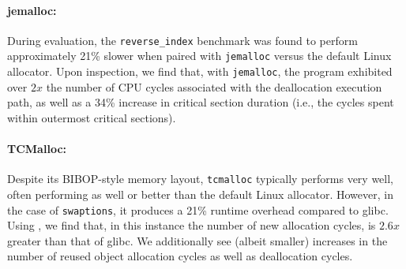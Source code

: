 \paragraph{jemalloc:}
During evaluation, the \texttt{reverse\_index} benchmark was found to perform approximately 21\% slower when paired with \texttt{jemalloc} versus the default Linux allocator. Upon inspection, we find that, with \texttt{jemalloc}, the program exhibited over $2x$ the number of CPU cycles associated with the deallocation execution path, as well as a 34\% increase in critical section duration (i.e., the cycles spent within outermost critical sections).

\paragraph{TCMalloc:}
Despite its BIBOP-style memory layout, \texttt{tcmalloc} typically performs very well, often performing as well or better than the default Linux allocator. However, in the case of \texttt{swaptions}, it produces a 21\% runtime overhead compared to glibc. Using \MP{}, we find that, in this instance the number of new allocation cycles, is $2.6x$ greater than that of glibc. We additionally see (albeit smaller) increases in the number of reused object allocation cycles as well as deallocation cycles.

